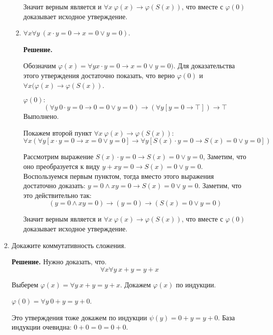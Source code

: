 \begin{enumerate}
\begin{enumerate}
Значит верным является и $\forall x \ \varphi(x) \to \varphi(S(x))$, что вместе с $\varphi(0)$ доказывает 
исходное утверждение.

\item $\forall x \forall y\ (x \cdot y = 0 \to x = 0 \lor y = 0)$.

\textbf{Решение.} 

Обозначим $\varphi(x) = \forall y x \cdot y = 0 \to x = 0 \lor y = 0)$. Для доказательства этого утверждения 
достаточно показать, что верно $\varphi(0)$ и $\forall x (\varphi(x) \to \varphi(S(x))$.

$\varphi(0):$ 
\begin{equation*}
(\forall y \ 0 \cdot y = 0 \to 0 = 0 \lor y = 0) \to (\forall y [y = 0 \to \top]) \to \top 
\end{equation*}
Выполнено.

Покажем второй пункт  $\forall x \ \varphi(x) \to \varphi(S(x))$:
\begin{equation*}
\forall x (\forall y [x \cdot y = 0 \to x = 0 \lor y = 0] \to \forall y [S(x) \cdot y = 0 \to S(x) = 0 \lor y = 0])
\end{equation*}

Рассмотрим выражение $S(x) \cdot y = 0 \to S(x) = 0 \lor y = 0$, Заметим, что оно преобразуется к виду $y + xy = 0 \to S(x) = 0 \lor y = 0$. Воспользуемся первым пунктом, тогда вместо этого выражения достаточно доказать: $y = 0 \land xy = 0 \to S(x) = 0 \lor y = 0$. Заметим, что это действительно так: 
\begin{equation*}
(y = 0 \land xy = 0) \to (y = 0) \to (S(x) = 0 \lor y = 0)
\end{equation*}

Значит верным является и $\forall x \ \varphi(x) \to \varphi(S(x))$, что вместе с $\varphi(0)$ доказывает 
исходное утверждение.
\end{enumerate}

\item Докажите коммутативность сложения.

\textbf{Решение.} Нужно доказать, что.
\begin{equation*}
\forall x \forall y \ x + y = y + x
\end{equation*}

Выберем $\varphi(x) = \forall y \ x + y = y + x$. Докажем $\varphi(x)$ по индукции.

$\varphi(0) = \forall y \ 0 + y = y + 0$.

Это утверждения тоже докажем по индукции $\psi(y) = 0 + y = y + 0$.
База индукции очевидна: $0 + 0 = 0 = 0 + 0$.


\end{enumerate}
